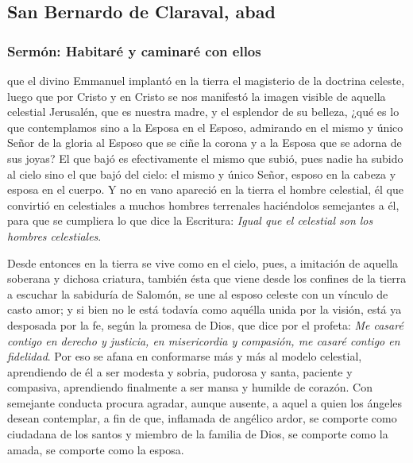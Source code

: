 \subsection{San Bernardo de Claraval, abad}

\subsubsection{Sermón: Habitaré y caminaré con ellos}


\begin{body}
	 que el divino Emmanuel implantó en la tierra el magisterio de la doctrina celeste, luego que por Cristo y en Cristo se nos manifestó la imagen visible de aquella celestial Jerusalén, que es nuestra madre, y el esplendor de su belleza, ¿qué es lo que contemplamos sino a la Esposa en el Esposo, admirando en el mismo y único Señor de la gloria al Esposo que se ciñe la corona y a la Esposa que se adorna de sus joyas? El que bajó es efectivamente el mismo que subió, pues nadie ha subido al cielo sino el que bajó del cielo: el mismo y único Señor, esposo en la cabeza y esposa en el cuerpo. Y no en vano apareció en la tierra el hombre celestial, él que convirtió en celestiales a muchos hombres terrenales haciéndolos semejantes a él, para que se cumpliera lo que dice la Escritura: \emph{Igual que el celestial son los hombres celestiales}.
	
	Desde entonces en la tierra se vive como en el cielo, pues, a imitación de aquella soberana y dichosa criatura, también ésta que viene desde los confines de la tierra a escuchar la sabiduría de Salomón, se une al esposo celeste con un vínculo de casto amor; y si bien no le está todavía como aquélla unida por la visión, está ya desposada por la fe, según la promesa de Dios, que dice por el profeta: \emph{Me casaré contigo en derecho y justicia, en misericordia y compasión, me casaré contigo en fidelidad}. Por eso se afana en conformarse más y más al modelo celestial, aprendiendo de él a ser modesta y sobria, pudorosa y santa, paciente y compasiva, aprendiendo finalmente a ser mansa y humilde de corazón. Con semejante conducta procura agradar, aunque ausente, a aquel a quien los ángeles desean contemplar, a fin de que, inflamada de angélico ardor, se comporte como ciudadana de los santos y miembro de la familia de Dios, se comporte como la amada, se comporte como la esposa.
	

\end{body}
